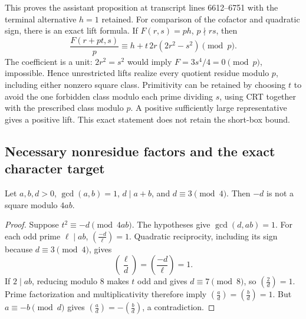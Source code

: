 This proves the assistant proposition at transcript lines 6612--6751
with the terminal alternative \(h=1\) retained. For comparison of
the cofactor and quadratic sign, there is an exact lift formula.
If \(F(r,s)=ph\), \(p\nmid rs\), then
\[
 \frac{F(r+pt,s)}p\equiv h+t\,2r(2r^2-s^2)\pmod p.
 \tag{BP12}
\]
The coefficient is a unit: \(2r^2=s^2\) would imply
\(F=3s^4/4=0\pmod p\), impossible. Hence unrestricted lifts
realize every quotient residue modulo \(p\), including either
nonzero square class. Primitivity can be retained by choosing \(t\)
to avoid the one forbidden class modulo each prime dividing \(s\),
using CRT together with the prescribed class modulo \(p\).
A positive sufficiently large representative gives a positive lift.
This exact statement does not retain the short-box bound.

\subsection{Necessary nonresidue factors and the exact character target}

\begin{lemma}\label{lem:bp-square}
Let \(a,b,d>0\), \(\gcd(a,b)=1\), \(d\mid a+b\), and
\(d\equiv3\pmod4\). Then \(-d\) is not a square modulo \(4ab\).
\end{lemma}
\begin{proof}
Suppose \(t^2\equiv-d\pmod{4ab}\). The hypotheses give
\(\gcd(d,ab)=1\). For each odd prime \(\ell\mid ab\),
\(\left(\frac{-d}{\ell}\right)=1\). Quadratic reciprocity,
including its sign because \(d\equiv3\pmod4\), gives
\[
 \left(\frac\ell d\right)=\left(\frac{-d}\ell\right)=1.
\]
If \(2\mid ab\), reducing modulo 8 makes \(t\) odd and gives
\(d\equiv7\pmod8\), so \(\left(\frac2d\right)=1\).
Prime factorization and multiplicativity therefore imply
\(\left(\frac ad\right)=\left(\frac bd\right)=1\).
But \(a\equiv-b\pmod d\) gives
\(\left(\frac ad\right)=-\left(\frac bd\right)\), a contradiction.
\end{proof}

